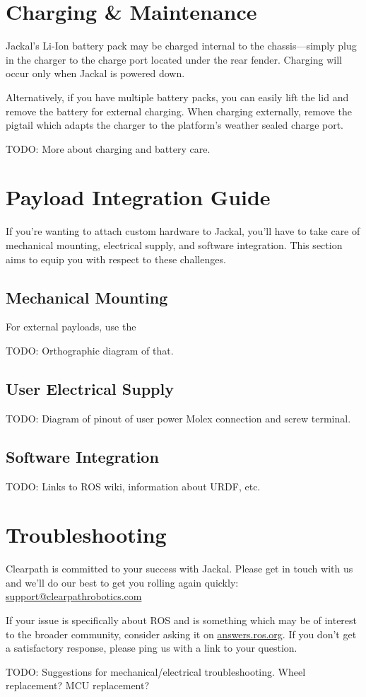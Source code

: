 \documentclass[]{clearpath-manual}
\begin{document}
\section{Charging \& Maintenance}

Jackal's Li-Ion battery pack may be charged internal to the chassis---simply plug in
the charger to the charge port located under the rear fender. Charging will occur
only when Jackal is powered down.

Alternatively, if you have multiple battery packs, you can easily lift the lid and
remove the battery for external charging. When charging externally, remove the pigtail
which adapts the charger to the platform's weather sealed charge port.

TODO: More about charging and battery care.


\section{Payload Integration Guide}

If you're wanting to attach custom hardware to Jackal, you'll have to take care of
mechanical mounting, electrical supply, and software integration. This section
aims to equip you with respect to these challenges.

\subsection{Mechanical Mounting}

For external payloads, use the 

TODO: Orthographic diagram of that.

\subsection{User Electrical Supply}\label{payload-elec}

TODO: Diagram of pinout of user power Molex connection and screw terminal.

\subsection{Software Integration}

TODO: Links to ROS wiki, information about URDF, etc.


\section{Troubleshooting}\label{trouble}

Clearpath is committed to your success with Jackal. Please get in touch with us and we'll
do our best to get you rolling again quickly: \href{mailto:support@clearpathrobotics.com}{support@clearpathrobotics.com}

If your issue is specifically about ROS and is something which may be of interest
to the broader community, consider asking it on \href{http://answers.ros.org}{answers.ros.org}.
If you don't get a satisfactory response, please ping us with a link to your question.

TODO: Suggestions for mechanical/electrical troubleshooting. Wheel replacement? MCU replacement? 
\end{document}
